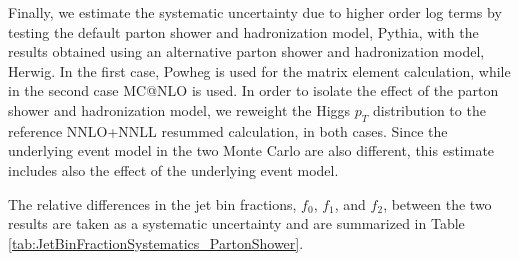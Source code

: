 
Finally, we estimate the systematic uncertainty due to higher order log terms by testing the default 
parton shower and hadronization model, Pythia, with the results obtained using an alternative
parton shower and hadronization model, Herwig. In the first case, Powheg is used for the matrix
element calculation, while in the second case MC@NLO is used. In order to isolate the effect of the 
parton shower and hadronization model, we reweight the Higgs $p_{T}$ distribution to the reference 
NNLO+NNLL resummed calculation, in both cases. Since the underlying event model in the two Monte Carlo 
are also different, this estimate includes also the effect of the underlying event model. 

The relative differences in the jet bin fractions, $f_{0}$, $f_{1}$, and $f_{2}$, 
between the two results are taken as a systematic uncertainty and are 
summarized in Table \ref{tab:JetBinFractionSystematics_PartonShower}.

